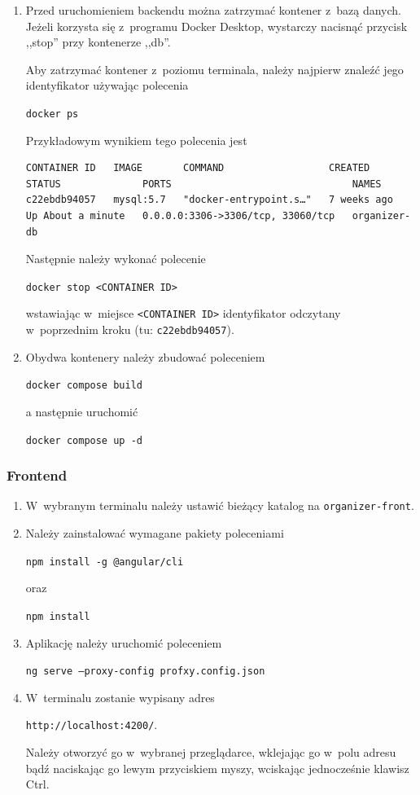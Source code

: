 \documentclass[a4paper,twoside,12pt]{book}
\begin{document}
\begin{enumerate}
	\item Przed uruchomieniem backendu można zatrzymać kontener z~bazą danych. Jeżeli korzysta się z~programu Docker Desktop, wystarczy nacisnąć przycisk ,,stop'' przy kontenerze ,,db''.

	Aby zatrzymać kontener z~poziomu terminala, należy najpierw znaleźć jego identyfikator używając polecenia 

	\texttt{docker ps}

	Przykładowym wynikiem tego polecenia jest

	\begin{verbatim}
CONTAINER ID   IMAGE       COMMAND                  CREATED       STATUS              PORTS                               NAMES
c22ebdb94057   mysql:5.7   "docker-entrypoint.s…"   7 weeks ago   Up About a minute   0.0.0.0:3306->3306/tcp, 33060/tcp   organizer-db
	\end{verbatim}

	Następnie należy wykonać polecenie

	\texttt{docker stop <CONTAINER ID>}

	wstawiając w~miejsce \texttt{<CONTAINER ID>} identyfikator odczytany w~poprzednim kroku (tu: \texttt{c22ebdb94057}).

	\item Obydwa kontenery należy zbudować poleceniem 

	\texttt{docker compose build}

	a następnie uruchomić 

	\texttt{docker compose up -d}
    \end{enumerate}

\subsubsection{Frontend}

\begin{enumerate}
	 \item W~wybranym terminalu należy ustawić bieżący katalog na \texttt{organizer-front}.

	 \item Należy zainstalować wymagane pakiety poleceniami

	 \texttt{npm install -g @angular/cli} 
	 
	 oraz
	 
	 \texttt{npm install}

	 \item Aplikację należy uruchomić poleceniem

	 \texttt{ng serve --proxy-config profxy.config.json}

	 \item W~terminalu zostanie wypisany adres 

	 \texttt{http://localhost:4200/}.

	Należy otworzyć go w~wybranej przeglądarce, wklejając go w~polu adresu bądź naciskając go lewym przyciskiem myszy, wciskając jednocześnie klawisz Ctrl.

	 \end{enumerate}
\end{document}
